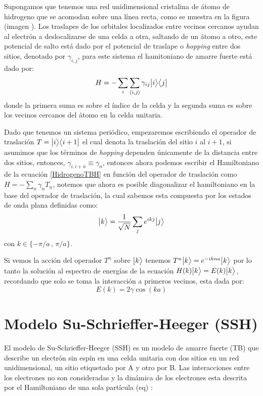     Supongamos que tenemos una red unidimensional cristalina de átomo de hidrogeno que se acomodan sobre una línea recta, como se muestra en la figura (imagen ). Los traslapes de los orbitales localizados entre vecinos cercanos ayudan al electrón a deslocalizarse de una celda a otra, saltando de un átomo a otro, este potencial de salto está dado por el potencial de traslape o \textit{hopping} entre dos sitios, denotado por $\gamma_{i,j}$, para este sistema el hamitoniano de amarre fuerte está dado por:
    \begin{equation}\label{HidrogenoTBH}
        H =  -\sum_{i}\sum_{\langle i, j \rangle } \gamma_{ij} \big |{i}\big \rangle\big \langle{j}\big |
    \end{equation}
    donde la primera suma es sobre el índice de la celda y la segunda suma es sobre los vecinos cercanos del átomo en la celda unitaria.
    
    Dado que tenemos un sistema periódico, empezaremos escribiendo el operador de traslación $T = \big |{i}\big \rangle\big \langle{i+1}\big |$ el cual denota la traslación del sitio $i$ al $i+1$, si asumimos que los términos de {\it hopping} dependen únicamente de la distancia entre dos sitios, entonces, $\gamma_{i,i+n} \equiv \gamma_{n}$, entonces ahora podemos escribir el Hamiltoniano de la ecuación \eqref{HidrogenoTBH} en función del operador de traslación como $H = -\sum_n \gamma_n T_n$, notemos que ahora es posible diagonalizar el hamiltoniano en la base del operador de traslación, la cual sabemos esta compuesta por los estados de onda plana definidas como:
    \begin{equation}
        \big |{k}\big \rangle = \frac{1}{\sqrt{N}} \sum_j e^{ikj} \big |{j}\big \rangle 
    \end{equation}
    con $k \in \{-\pi/a\,,\,\pi/a\}$.
    
    Si vemos la acción del operador $T^n$ sobre $\big |{k}\big \rangle$ tenemos $T^n \big |{k}\big \rangle =  e^{-ikna}\big |{k}\big \rangle$ 
    por lo tanto la solución al espectro de energías de la ecuación $H(k)\big |{k}\big \rangle = E(k)\big |{k}\big \rangle$, recordando que solo se toma la interacción a primeros vecinos, esta dada por:
    \begin{equation}
        E(k) = 2\gamma \cos(ka)
    \end{equation}
    
    \section{Modelo Su-Schrieffer-Heeger (SSH)}
    

El modelo de Su-Schrieffer-Heeger (SSH) es un modelo de amarre fuerte (TB) que describe un electrón sin espín en una celda unitaria con dos sitios en un red unidimensional, un sitio etiquetado por A y otro por B. Las interacciones entre los electrones no son consideradas y la dinámica de los electrones esta descrita por el Hamiltoniano de una sola partícula (eq) : 

